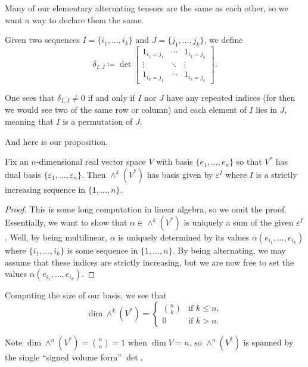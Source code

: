 \documentclass[../notes.tex]{subfiles}
\begin{document}
Many of our elementary alternating tensors are the same as each other, so we want a way to declare them the same.
\begin{notation}
	Given two sequences $I=\{i_1,\ldots,i_k\}$ and $J=\{j_1,\ldots,j_k\}$, we define
	\[\delta_{I,J}\coloneqq\det\begin{bmatrix}
		1_{i_1=j_1} & \cdots & 1_{i_1=j_k} \\
		\vdots & \ddots & \vdots \\
		1_{i_k=j_1} & \cdots & 1_{i_k=j_k}
	\end{bmatrix}.\]
\end{notation}
\begin{remark}
	One sees that $\delta_{I,J}\ne0$ if and only if $I$ nor $J$ have any repeated indices (for then we would see two of the same row or column) and each element of $I$ lies in $J$, meaning that $I$ is a permutation of $J$.
\end{remark}
And here is our proposition.
\begin{proposition}
	Fix an $n$-dimensional real vector space $V$ with basis $\{e_1,\ldots,e_n\}$ so that $V^*$ has dual basis $\{\varepsilon_1,\ldots,\varepsilon_n\}$. Then $\land^k(V^*)$ has basis given by $\varepsilon^I$ where $I$ is a strictly increasing sequence in $\{1,\ldots,n\}$.
\end{proposition}
\begin{proof}
	This is some long computation in linear algebra, so we omit the proof. Essentially, we want to show that $\alpha\in\land^k(V^*)$ is uniquely a sum of the given $\varepsilon^I$. Well, by being multilinear, $\alpha$ is uniquely determined by its values $\alpha(e_{i_1},\ldots,e_{i_k})$ where $\{i_1,\ldots,i_k\}$ is some sequence in $\{1,\ldots,n\}$. By being alternating, we may assume that these indices are strictly increasing, but we are now free to set the values $\alpha(e_{i_1},\ldots,e_{i_k})$.
\end{proof}
\begin{remark}
	Computing the size of our basis, we see that
	\[\dim\land^k(V^*)=\begin{cases}
		\binom nk & \text{if }k\le n, \\
		0 & \text{if }k>n.
	\end{cases}\]
\end{remark}
\begin{example}
	Note $\dim \land^n(V^*)=\binom nn=1$ when $\dim V=n$, so $\land^n(V^*)$ is spanned by the single ``signed volume form'' $\det$.
\end{example}
\end{document}
